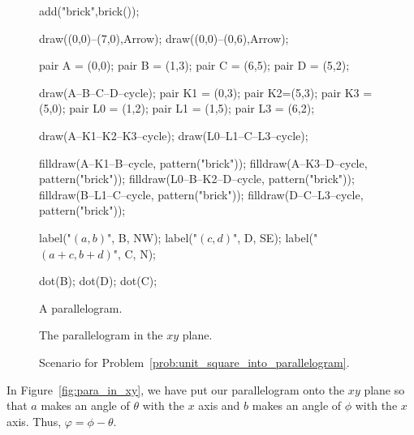\documentclass[../key.tex]{subfiles}
\begin{document}
\begin{figure}[h]
\begin{center}
\begin{minipage}[b]{0.3\textwidth}
\begin{asy}[width=0.9\textwidth]
				add("brick",brick());

				draw((0,0)--(7,0),Arrow);
				draw((0,0)--(0,6),Arrow);

				pair A = (0,0);
				pair B = (1,3);
				pair C = (6,5);
				pair D = (5,2);

				draw(A--B--C--D--cycle);
				pair K1 = (0,3);
				pair K2=(5,3);
				pair K3 = (5,0);
				pair L0 = (1,2);
				pair L1 = (1,5);
				pair L3 = (6,2);

				draw(A--K1--K2--K3--cycle);
				draw(L0--L1--C--L3--cycle);

				filldraw(A--K1--B--cycle, pattern("brick"));
				filldraw(A--K3--D--cycle, pattern("brick"));
				filldraw(L0--B--K2--D--cycle, pattern("brick"));
				filldraw(B--L1--C--cycle, pattern("brick"));
				filldraw(D--C--L3--cycle, pattern("brick"));

				label("$(a,b)$", B, NW);
				label("$(c,d)$", D, SE);
				label("$(a+c,b+d)$", C, N);

				dot(B);
				dot(D);
				dot(C);

			\end{asy}
		\end{minipage}
	\end{center}
	\vspace*{-2\baselineskip}
	\begin{center}
		\begin{minipage}[t]{0.3\textwidth}
			\caption{A parallelogram.}
			\label{fig:parallelogram_generic}
		\end{minipage}
		\hfill
		\begin{minipage}[t]{0.3\textwidth}
			\caption{The parallelogram in the $xy$ plane.}
			\label{fig:para_in_xy}
		\end{minipage}
		\hfill
		\begin{minipage}[t]{0.3\textwidth}
			\caption{Scenario for Problem~\ref{prob:unit_square_into_parallelogram}.}
			\label{fig:para_scenario}
		\end{minipage}
	\end{center}
\end{figure}


\begin{outer_problem}
\item In Figure~\ref{fig:para_in_xy}, we have put our parallelogram onto the $xy$ plane so that $a$ makes an angle of $\theta$ with the $x$ axis and $b$ makes an angle of $\phi$ with the $x$ axis. Thus, $\varphi=\phi-\theta$.
\end{outer_problem}
\end{document}
